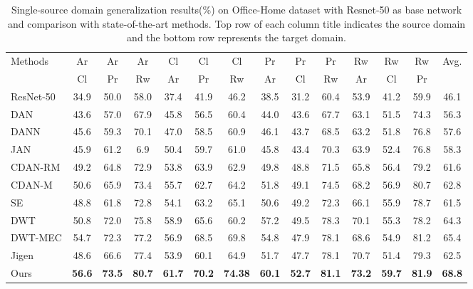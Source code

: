 \documentclass[10pt,twocolumn,letterpaper]{article}
\begin{document}
\begin{table*}[t!]
	\begin{center}
		\def\arraystretch{1}
		\begin{tabular}{l|c c c c c c c c c c c c|c}
			\hline
			\hline
			\multirow{2}{*}{Methods}&Ar&Ar&Ar&Cl&Cl&Cl&Pr&Pr&Pr&Rw&Rw&Rw&\multirow{2}{*}{Avg.}\\
			&Cl&Pr&Rw&Ar&Pr&Rw&Ar&Cl&Rw&Ar&Cl&Pr&\\
			\hline
			ResNet-50&34.9&50.0&58.0&37.4&41.9&46.2&38.5&31.2&60.4&53.9&41.2&59.9&46.1\\
			DAN\cite{long2015learning}&43.6&57.0&67.9&45.8&56.5&60.4&44.0&43.6&67.7&63.1&51.5&74.3&56.3\\
			DANN\cite{ganin2016domain}&45.6&59.3&70.1&47.0&58.5&60.9&46.1&43.7&68.5&63.2&51.8&76.8&57.6\\
			JAN\cite{long2017deep}&45.9&61.2&6.9&50.4&59.7&61.0&45.8&43.4&70.3&63.9&52.4&76.8&58.3\\
			CDAN-RM\cite{long2018conditional}&49.2&64.8&72.9&53.8&63.9&62.9&49.8&48.8&71.5&65.8&56.4&79.2&61.6\\
			CDAN-M\cite{long2018conditional}&50.6&65.9&73.4&55.7&62.7&64.2&51.8&49.1&74.5&68.2&56.9&80.7&62.8\\
			SE\cite{french2017self}&48.8&61.8&72.8&54.1&63.2&65.1&50.6&49.2&72.3&66.1&55.9&78.7&61.5\\
			DWT\cite{roy2019unsupervised}&50.8&72.0&75.8&58.9&65.6&60.2&57.2&49.5&78.3&70.1&55.3&78.2&64.3\\
			DWT-MEC\cite{roy2019unsupervised}&54.7&72.3&77.2&56.9&68.5&69.8&54.8&47.9&78.1&68.6&54.9&81.2&65.4\\
			Jigen\cite{carlucci2019domain}&48.6&66.6&77.4&53.9&60.1&64.9&51.7&47.7&78.1&70.7&51.4&79.3&62.5\\
			Ours&\textbf{56.6}&\textbf{73.5}&\textbf{80.7}&\textbf{61.7}&\textbf{70.2}&\textbf{74.38}&\textbf{60.1}&\textbf{52.7}&\textbf{81.1}&\textbf{73.2}&\textbf{59.7}&\textbf{81.9}&\textbf{68.8}\\
			\hline\hline
		\end{tabular}
	\end{center}
	\caption{Single-source domain generalization results(\%) on Office-Home dataset\cite{venkateswara2017deep} with Resnet-50 as base network and comparison with state-of-the-art methods. Top row of each column title indicates the source domain and the bottom row represents the target domain.}
	\label{table2}
\end{table*}
\end{document}

